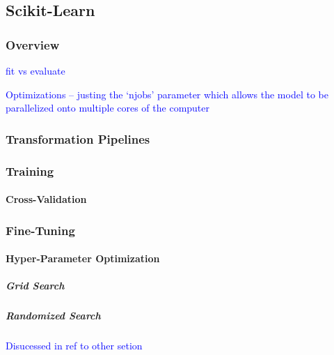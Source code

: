 \subsection{Scikit-Learn}

\subsubsection{Overview}

\textcolor{blue}{fit vs evaluate}

\textcolor{blue}{Optimizations -- justing the `njobs' parameter which allows the model to be parallelized onto multiple cores of the computer}


\subsubsection{Transformation Pipelines}

\subsubsection{Training}

\paragraph{Cross-Validation}

\subsubsection{Fine-Tuning}

\paragraph{Hyper-Parameter Optimization}

\subparagraph{Grid Search}

\subparagraph{Randomized Search}

\textcolor{blue}{Disucessed in ref to other setion}
